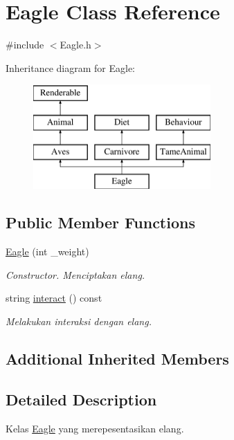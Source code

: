 \hypertarget{classEagle}{\section{Eagle Class Reference}
\label{classEagle}
}


{\ttfamily \#include $<$Eagle.\+h$>$}

Inheritance diagram for Eagle\+:\begin{figure}[H]
\begin{center}
\leavevmode
\includegraphics[height=4.000000cm]{classEagle}
\end{center}
\end{figure}
\subsection*{Public Member Functions}
\begin{DoxyCompactItemize}
\item 
\hypertarget{classEagle_ade1c532a412904896453a632974d1260}{\hyperlink{classEagle_ade1c532a412904896453a632974d1260}{Eagle} (int \+\_\+weight)}\label{classEagle_ade1c532a412904896453a632974d1260}

\begin{DoxyCompactList}\small\item\em Constructor. Menciptakan elang. \end{DoxyCompactList}\item 
string \hyperlink{classEagle_a9d5e9e67b1a4661bcab31bc13d951d57}{interact} () const 
\begin{DoxyCompactList}\small\item\em Melakukan interaksi dengan elang. \end{DoxyCompactList}\end{DoxyCompactItemize}
\subsection*{Additional Inherited Members}


\subsection{Detailed Description}
Kelas \hyperlink{classEagle}{Eagle} yang merepesentasikan elang. 

